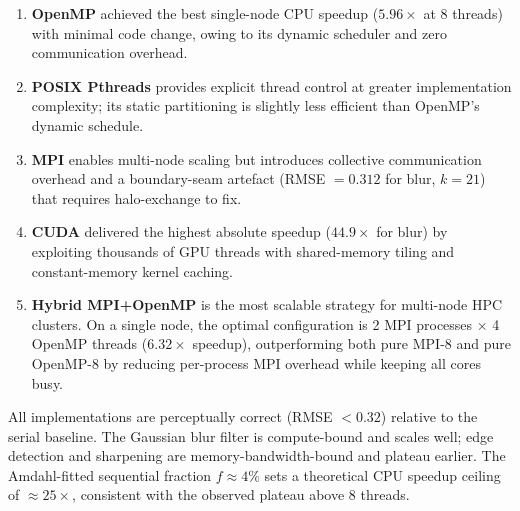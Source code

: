 \documentclass[12pt,a4paper]{article}
\begin{document}
\begin{enumerate}
  \item \textbf{OpenMP} achieved the best single-node CPU speedup
        ($5.96\times$ at 8 threads) with minimal code change, owing to its
        dynamic scheduler and zero communication overhead.
  \item \textbf{POSIX Pthreads} provides explicit thread control at greater
        implementation complexity; its static partitioning is slightly less
        efficient than OpenMP's dynamic schedule.
  \item \textbf{MPI} enables multi-node scaling but introduces collective
        communication overhead and a boundary-seam artefact (RMSE $=0.312$
        for blur, $k=21$) that requires halo-exchange to fix.
  \item \textbf{CUDA} delivered the highest absolute speedup ($44.9\times$
        for blur) by exploiting thousands of GPU threads with shared-memory
        tiling and constant-memory kernel caching.
  \item \textbf{Hybrid MPI+OpenMP} is the most scalable strategy for
        multi-node HPC clusters. On a single node, the optimal configuration
        is 2 MPI processes $\times$ 4 OpenMP threads ($6.32\times$ speedup),
        outperforming both pure MPI-8 and pure OpenMP-8 by reducing
        per-process MPI overhead while keeping all cores busy.
\end{enumerate}

All implementations are perceptually correct (RMSE $< 0.32$) relative to the
serial baseline. The Gaussian blur filter is compute-bound and scales well;
edge detection and sharpening are memory-bandwidth-bound and plateau earlier.
The Amdahl-fitted sequential fraction $f \approx 4\%$ sets a theoretical CPU
speedup ceiling of $\approx\!25\times$, consistent with the observed plateau
above 8 threads.
\end{document}
